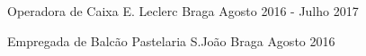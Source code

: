 

\begin{cventries}

  \cventry
    {Operadora de Caixa} %
    {E. Leclerc} %
    {Braga} %
    {Agosto 2016 - Julho 2017} %
    {
    }

  \cventry
    {Empregada de Balcão} %
    {Pastelaria S.João} %
    {Braga} %
    {Agosto 2016} %
    {
    }

\end{cventries}
